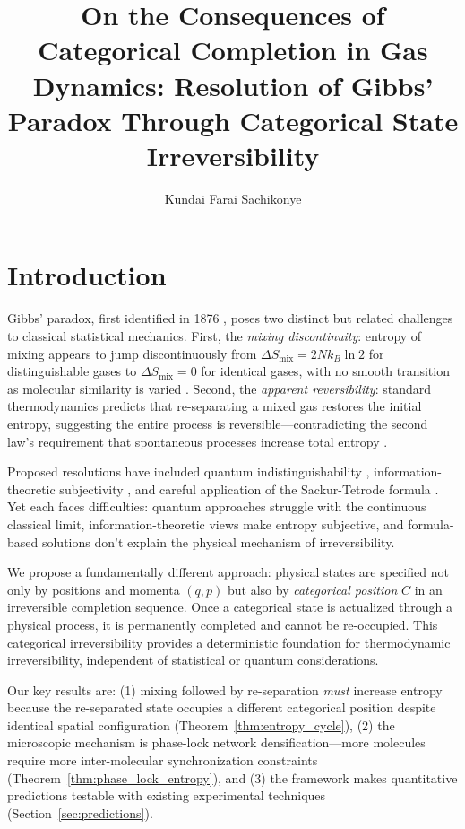 \title{On the Consequences of Categorical Completion in Gas Dynamics: Resolution of Gibbs' Paradox Through Categorical State Irreversibility}

\author{Kundai Farai Sachikonye}

\section{Introduction}

Gibbs' paradox, first identified in 1876 \cite{gibbs1876}, poses two distinct but related challenges to classical statistical mechanics. First, the \emph{mixing discontinuity}: entropy of mixing appears to jump discontinuously from $\Delta S_{\text{mix}} = 2Nk_B \ln 2$ for distinguishable gases to $\Delta S_{\text{mix}} = 0$ for identical gases, with no smooth transition as molecular similarity is varied \cite{swendsen2008,dieks2011}. Second, the \emph{apparent reversibility}: standard thermodynamics predicts that re-separating a mixed gas restores the initial entropy, suggesting the entire process is reversible—contradicting the second law's requirement that spontaneous processes increase total entropy \cite{allahverdyan2011}.

Proposed resolutions have included quantum indistinguishability \cite{bach1997,saunders2006}, information-theoretic subjectivity \cite{jaynes1992,hemmo1997}, and careful application of the Sackur-Tetrode formula \cite{denbigh1981,lin2015}. Yet each faces difficulties: quantum approaches struggle with the continuous classical limit, information-theoretic views make entropy subjective, and formula-based solutions don't explain the physical mechanism of irreversibility.

We propose a fundamentally different approach: physical states are specified not only by positions and momenta $(q,p)$ but also by \emph{categorical position} $C$ in an irreversible completion sequence. Once a categorical state is actualized through a physical process, it is permanently completed and cannot be re-occupied. This categorical irreversibility provides a deterministic foundation for thermodynamic irreversibility, independent of statistical or quantum considerations.

Our key results are: (1) mixing followed by re-separation \emph{must} increase entropy because the re-separated state occupies a different categorical position despite identical spatial configuration (Theorem~\ref{thm:entropy_cycle}), (2) the microscopic mechanism is phase-lock network densification—more molecules require more inter-molecular synchronization constraints (Theorem~\ref{thm:phase_lock_entropy}), and (3) the framework makes quantitative predictions testable with existing experimental techniques (Section~\ref{sec:predictions}).

